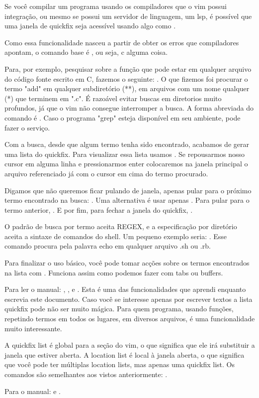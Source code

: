 Se você compilar um programa usando os compiladores que o vim possui integração, ou mesmo se possui um servidor de linguagem,
um lsp, é possível que uma janela de quickfix seja acessível usando algo como .

Como essa funcionalidade nasceu a partir de obter os erros que compiladores apontam, o comando base é , ou seja,
c alguma coisa.

Para, por exemplo, pesquisar sobre a função  que pode estar em qualquer
arquivo do código fonte escrito em C, fazemos o seguinte: .
O que fizemos foi procurar o termo "add" em qualquer subdiretório (**), em arquivos com um nome qualquer (*)
que terminem em ".c".
É razoável evitar buscas em diretorios muito profundos, já que o vim não consegue interromper a busca.
A forma abreviada do comando  é .
Caso o programa "grep" esteja disponível em seu ambiente,  pode fazer o serviço.

Com a busca, desde que algum termo tenha sido encontrado, acabamos de gerar uma lista do quickfix.
Para visualizar essa lista usamos .
Se repousarmos nosso cursor em alguma linha e pressionarmos enter colocaremos na janela principal o arquivo referenciado
já com o cursor em cima do termo procurado.

Digamos que não queremos ficar pulando de janela, apenas pular para o próximo termo encontrado na busca: .
Uma alternativa é usar apenas . 
Para pular para o termo anterior, .
E por fim, para fechar a janela do quickfix, .

O padrão de busca por termo aceita REGEX, e a especificação por diretório aceita a sintaxe de comandos do shell.
Um pequeno exemplo seria: .
Esse comando procura pela palavra echo em qualquer arquivo .sh ou .rb.

Para finalizar o uso básico, você pode tomar acções sobre os termos encontrados na lista com .
Funciona assim como podemos fazer com tabs ou buffers.

Para ler o manual: , ,  e .
Esta é uma das funcionalidades que aprendi enquanto escrevia este documento.
Caso você se interesse apenas por escrever textos a lista quickfix pode não ser muito mágica.
Para quem programa, usando funções, repetindo termos em todos os lugares, em diversos arquivos,
é uma funcionalidade muito interessante.

A quickfix list é global para a seção do vim, o que significa que ele irá substituir a janela que estiver aberta.
A location list é local à janela aberta, o que significa que você pode ter múltiplas location lists, mas apenas uma quickfix list.
Os comandos são semelhantes aos vistos anteriormente:    .

Para o manual:   e .

\newpage
